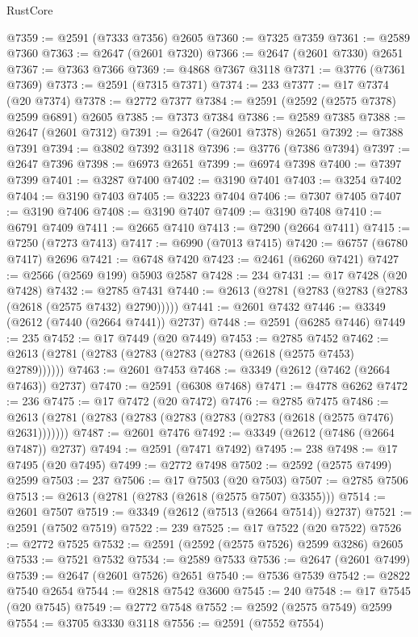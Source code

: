 \begin{lexlean}{RustCore}
\begin{coremodule}
@7359 := @2591 (@7333 @7356) @2605
@7360 := @7325 @7359
@7361 := @2589 @7360
@7363 := @2647 (@2601 @7320)
@7366 := @2647 (@2601 @7330) @2651
@7367 := @7363 @7366
@7369 := @4868 @7367 @3118
@7371 := @3776 (@7361 @7369)
@7373 := @2591 (@7315 @7371)
@7374 := 233
@7377 := @17 @7374 (@20 @7374)
@7378 := @2772 @7377
@7384 := @2591 (@2592 (@2575 @7378) @2599 @6891) @2605
@7385 := @7373 @7384
@7386 := @2589 @7385
@7388 := @2647 (@2601 @7312)
@7391 := @2647 (@2601 @7378) @2651
@7392 := @7388 @7391
@7394 := @3802 @7392 @3118
@7396 := @3776 (@7386 @7394)
@7397 := @2647 @7396
@7398 := @6973 @2651
@7399 := @6974 @7398
@7400 := @7397 @7399
@7401 := @3287 @7400
@7402 := @3190 @7401
@7403 := @3254 @7402
@7404 := @3190 @7403
@7405 := @3223 @7404
@7406 := @7307 @7405
@7407 := @3190 @7406
@7408 := @3190 @7407
@7409 := @3190 @7408
@7410 := @6791 @7409
@7411 := @2665 @7410
@7413 := @7290 (@2664 @7411)
@7415 := @7250 (@7273 @7413)
@7417 := @6990 (@7013 @7415)
@7420 := @6757 (@6780 @7417) @2696
@7421 := @6748 @7420
@7423 := @2461 (@6260 @7421)
@7427 := @2566 (@2569 @199) @5903 @2587
@7428 := 234
@7431 := @17 @7428 (@20 @7428)
@7432 := @2785 @7431
@7440 := @2613 (@2781 (@2783 (@2783 (@2783 (@2618 (@2575 @7432) @2790)))))
@7441 := @2601 @7432
@7446 := @3349 (@2612 (@7440 (@2664 @7441)) @2737)
@7448 := @2591 (@6285 @7446)
@7449 := 235
@7452 := @17 @7449 (@20 @7449)
@7453 := @2785 @7452
@7462 := @2613 (@2781 (@2783 (@2783 (@2783 (@2783 (@2618 (@2575 @7453) @2789))))))
@7463 := @2601 @7453
@7468 := @3349 (@2612 (@7462 (@2664 @7463)) @2737)
@7470 := @2591 (@6308 @7468)
@7471 := @4778 @6262
@7472 := 236
@7475 := @17 @7472 (@20 @7472)
@7476 := @2785 @7475
@7486 := @2613 (@2781 (@2783 (@2783 (@2783 (@2783 (@2783 (@2618 (@2575 @7476) @2631)))))))
@7487 := @2601 @7476
@7492 := @3349 (@2612 (@7486 (@2664 @7487)) @2737)
@7494 := @2591 (@7471 @7492)
@7495 := 238
@7498 := @17 @7495 (@20 @7495)
@7499 := @2772 @7498
@7502 := @2592 (@2575 @7499) @2599
@7503 := 237
@7506 := @17 @7503 (@20 @7503)
@7507 := @2785 @7506
@7513 := @2613 (@2781 (@2783 (@2618 (@2575 @7507) @3355)))
@7514 := @2601 @7507
@7519 := @3349 (@2612 (@7513 (@2664 @7514)) @2737)
@7521 := @2591 (@7502 @7519)
@7522 := 239
@7525 := @17 @7522 (@20 @7522)
@7526 := @2772 @7525
@7532 := @2591 (@2592 (@2575 @7526) @2599 @3286) @2605
@7533 := @7521 @7532
@7534 := @2589 @7533
@7536 := @2647 (@2601 @7499)
@7539 := @2647 (@2601 @7526) @2651
@7540 := @7536 @7539
@7542 := @2822 @7540 @2654
@7544 := @2818 @7542 @3600
@7545 := 240
@7548 := @17 @7545 (@20 @7545)
@7549 := @2772 @7548
@7552 := @2592 (@2575 @7549) @2599
@7554 := @3705 @3330 @3118
@7556 := @2591 (@7552 @7554)

\end{coremodule}
\end{lexlean}
